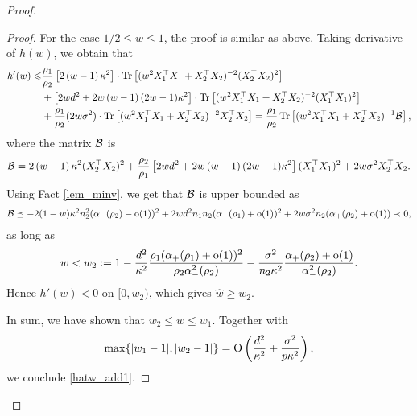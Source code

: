 \begin{proof}
\begin{proof}
For the case $1/2\le w\le 1$, the proof is similar as above. Taking derivative of $h(w)$, we obtain that
\begin{align}
	h'(w) \le& \frac{\rho_1}{\rho_2} \left[2\left( w-1\right) \kappa^2\right]\cdot \tr\left[( w^2X_1^{\top}X_1 +X_2^{\top}X_2)^{-2} (X_2^{\top}X_2)^2\right] \nonumber \\
	& +  \left[2wd^2 +2w\left( w-1\right)(2w-1)\kappa^2\right]\cdot \tr\left[( w^2X_1^{\top}X_1 +X_2^{\top}X_2)^{-2} (X_1^{\top}X_1)^2\right] \nonumber\\
	& + \frac{\rho_1}{\rho_2}(2 w\sigma^2) \cdot \bigtr{(w^2X_1^{\top}X_1 + X_2^{\top}X_2)^{-2} X_2^\top X_2  }= \frac{\rho_1}{\rho_2} \bigtr{(w^2X_1^{\top}X_1  + X_2^{\top}X_2)^{-1} \cal B} , \nonumber
\end{align}
where the matrix $\cal B$ is
$$\cal B= 2\left( w-1\right) \kappa^2  (X_2^{\top}X_2)^2+\frac{\rho_2}{\rho_1}\left[2wd^2 +2w\left( w-1\right)(2w-1)\kappa^2\right](X_1^{\top}X_1)^2 + 2 w\sigma^2 X_2^\top X_2 .$$
Using Fact \ref{lem_minv}, we get that $\cal B$ is upper bounded as
\begin{align*}
\cal B \preceq - 2(1-w)\kappa^2 n_2^2 (\al_-(\rho_2) -\oo(1))^2 +2w d^2 n_1n_2 (\al_+(\rho_1) +\oo(1))^2 + 2w\sigma^2 n_2 (\al_+(\rho_2)+\oo(1)) \prec 0,
\end{align*}
as long as
$$w< w_2:=1 -   \frac{d^2}{\kappa^2}\frac{\rho_1(\al_+(\rho_1) +\oo(1))^2}{\rho_2 \al_-^2(\rho_2) } -  \frac{\sigma^2}{n_2\kappa^2}\frac{\al_{+}(\rho_2)+\oo(1)}{\al_{-}^2(\rho_2)} .$$
Hence $h'(w)<0$ on $[0,w_2)$, %
which gives $\hat w\ge w_2$.

In sum, we have shown that $w_2\le w\le w_1$. Together with
$$\max\{|w_1 -1|, |w_2 -1|\} =\OO\left(\frac{d^2}{\kappa^2} + \frac{\sigma^2}{p\kappa^2}\right),$$
we conclude \eqref{hatw_add1}.
\end{proof}


\end{proof}
